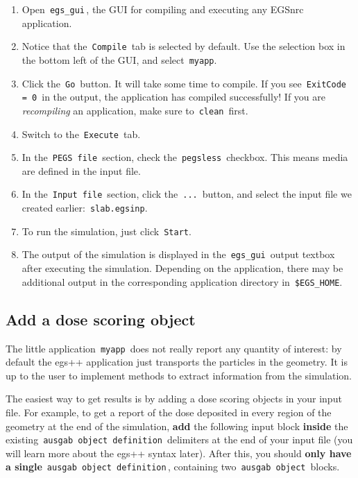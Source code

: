 \documentclass[12pt,twoside]{article}
\begin{document}
\begin{enumerate}
\item Open \,\Verb|egs_gui|\,, the GUI for compiling and executing any EGSnrc application.
\item Notice that the \,\Verb|Compile|\, tab is selected by default. Use the selection box in the bottom left of the GUI, and select \,\Verb|myapp|.
\item Click the \,\Verb|Go|\, button. It will take some time to compile. If you see \,\Verb|ExitCode = 0|\, in the output, the application has compiled successfully! If you are \textit{recompiling} an application, make sure to \,\Verb|clean|\, first.
\item Switch to the \,\Verb|Execute|\, tab.
\item In the \,\Verb|PEGS file|\, section, check the \,\Verb|pegsless|\, checkbox. This means media are defined in the input file.
\item In the \,\Verb|Input file|\, section, click the \,\Verb|...|\, button, and
select the input file we created earlier: \,\Verb|slab.egsinp|.
\item To run the simulation, just click \,\Verb|Start|.
\item The output of the simulation is displayed in the \,\Verb|egs_gui|\, output
textbox after executing the simulation. Depending on the application, there
may be additional output in the corresponding application directory in
\,\Verb|$EGS_HOME|.
\end{enumerate}

\subsection{Add a dose scoring object}

The little application \,\Verb|myapp|\, does not really report any quantity
of interest: by default the egs++ application just transports the
particles in the geometry. It is up to the user to implement methods to
extract information from the simulation.

The easiest way to get results is by adding a dose scoring objects in
your input file. For example, to get a report of the dose deposited in
every region of the geometry at the end of the simulation, \textbf{add}
the following input block \textbf{inside} the existing
\,\Verb|ausgab object definition|\, delimiters at the end of your input
file (you will learn more about the egs++ syntax later). After this, you should
\textbf{only have a single} \,\Verb|ausgab object definition|\,, containing two
\,\Verb|ausgab object|\, blocks.
\end{document}
